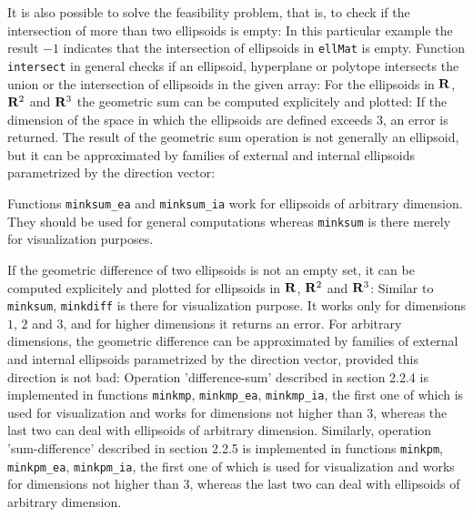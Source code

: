 It is also possible to solve the feasibility problem, that is, to check
if the intersection of more than two ellipsoids is empty:
In this particular example the result $-1$ indicates that the intersection
of ellipsoids in {\tt ellMat} is empty.
Function {\tt intersect} in general checks if an ellipsoid,
hyperplane or polytope intersects the union or the intersection
of ellipsoids in the given array:
For the ellipsoids in ${\bf R}$, ${\bf R}^2$ and ${\bf R}^3$ the geometric
sum can be computed explicitely and plotted:
If the dimension of the space in which the ellipsoids are defined exceeds $3$,
an error is returned. The result of the geometric sum operation is
not generally an ellipsoid, but it can be approximated by families
of external and internal ellipsoids parametrized by the direction vector:

Functions {\tt minksum\_ea} and {\tt minksum\_ia} work for ellipsoids of
arbitrary dimension. They should be used for general computations
whereas {\tt minksum} is there merely for visualization purposes.

If the geometric difference of two ellipsoids is not an empty set, it can
be computed explicitely and plotted for ellipsoids in ${\bf R}$,
${\bf R}^2$ and ${\bf R}^3$:
Similar to {\tt minksum}, {\tt minkdiff} is there for visualization
purpose. It works only for dimensions $1$, $2$ and $3$, and for higher
dimensions it returns an error. For arbitrary dimensions, the geometric
difference can be approximated by  families of external and internal
ellipsoids parametrized by the direction vector, provided this direction
is not bad:
Operation 'difference-sum' described in section 2.2.4 is implemented in
functions {\tt minkmp}, {\tt minkmp\_ea}, {\tt minkmp\_ia}, the first one of
which is used for visualization and works for dimensions not higher than $3$,
whereas the last two can deal with ellipsoids of arbitrary dimension.
Similarly, operation 'sum-difference' described in section 2.2.5
is implemented in
functions {\tt minkpm}, {\tt minkpm\_ea}, {\tt minkpm\_ia}, the first one of
which is used for visualization and works for dimensions not higher than $3$,
whereas the last two can deal with ellipsoids of arbitrary dimension.
